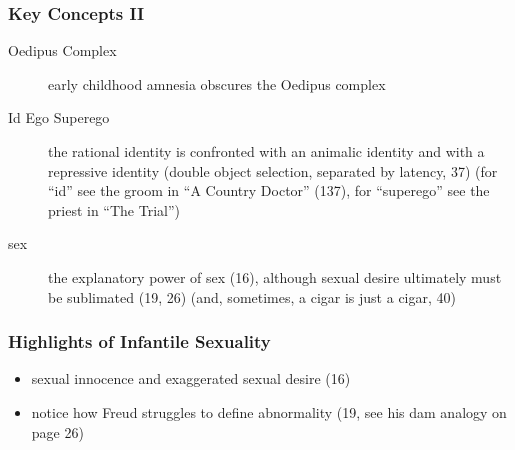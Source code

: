 \documentclass[xcolor=dvipsnames]{beamer}
\begin{document}
\begin{frame}
  \frametitle{Key Concepts II} 
  \begin{description}
  \item[Oedipus Complex] early childhood amnesia obscures the Oedipus
    complex
  \item[Id Ego Superego] the rational identity is confronted with an
    animalic identity and with a repressive identity (double object
    selection, separated by latency, 37) (for ``id'' see the groom in
    ``A Country Doctor'' (137), for ``superego'' see the priest in ``The
    Trial'')
  \item[sex] the explanatory power of sex (16), although sexual desire
    ultimately must be sublimated (19, 26) (and, sometimes, a cigar is
    just a cigar, 40)
  \end{description}
\end{frame}

\begin{frame}
  \frametitle{Highlights of Infantile Sexuality} 
  \begin{itemize}
  \item sexual innocence and exaggerated sexual desire (16)
  \item notice how Freud struggles to define abnormality (19, see his
    dam analogy on page 26)
  \end{itemize}
\end{frame}
\end{document}
